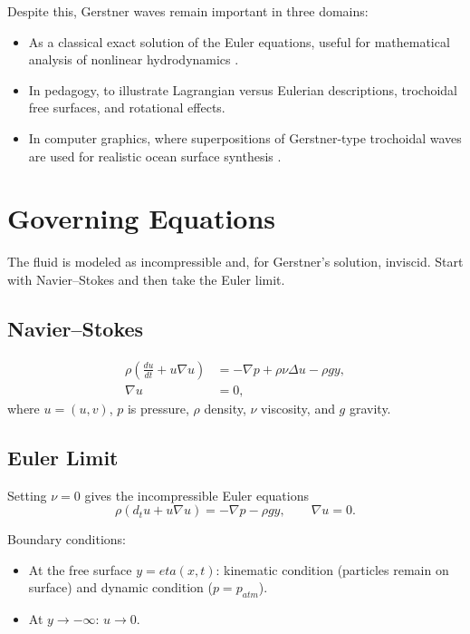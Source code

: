 \documentclass[journal,10pt,twocolumn]{IEEEtran}
\def\eta{eta}%
\def\mathbf#1{#1}%
\def\hat#1{#1}%
\def\partial{d}%
\def\mathrm#1{#1}%
\def\cdot{}%
\begin{document}
Despite this, Gerstner waves remain important in three domains:
\begin{itemize}[leftmargin=1.4em]
    \item As a classical exact solution of the Euler equations, useful for mathematical analysis of nonlinear hydrodynamics \cite{craik2004origins,constantin2001gerstner}.
    \item In pedagogy, to illustrate Lagrangian versus Eulerian descriptions, trochoidal free surfaces, and rotational effects.
    \item In computer graphics, where superpositions of Gerstner-type trochoidal waves are used for realistic ocean surface synthesis \cite{tessendorf2001simulating}.
\end{itemize}

\section{Governing Equations}

The fluid is modeled as incompressible and, for Gerstner's solution, inviscid. Start with Navier--Stokes and then take the Euler limit.

\subsection{Navier--Stokes}

\begin{align}
    \rho \left( \frac{\partial \mathbf{u}}{\partial t} + \mathbf{u}\cdot\nabla\mathbf{u} \right)
    &= - \nabla p + \rho \nu \Delta \mathbf{u} - \rho g \hat{\mathbf{y}}, \\
    \nabla\cdot \mathbf{u} &= 0,
\end{align}
where $\mathbf{u}=(u,v)$, $p$ is pressure, $\rho$ density, $\nu$ viscosity, and $g$ gravity.

\subsection{Euler Limit}

Setting $\nu=0$ gives the incompressible Euler equations
\begin{equation}
    \rho \left( \partial_t \mathbf{u} + \mathbf{u}\cdot\nabla\mathbf{u} \right)
    = - \nabla p - \rho g \hat{\mathbf{y}},
    \qquad
    \nabla \cdot \mathbf{u} = 0.
\end{equation}

Boundary conditions:
\begin{itemize}[leftmargin=1.4em]
    \item At the free surface $y=\eta(x,t)$: kinematic condition (particles remain on surface) and dynamic condition ($p=p_{\mathrm{atm}}$).
    \item At $y\to -\infty$: $\mathbf{u}\to 0$.
\end{itemize}
\end{document}
